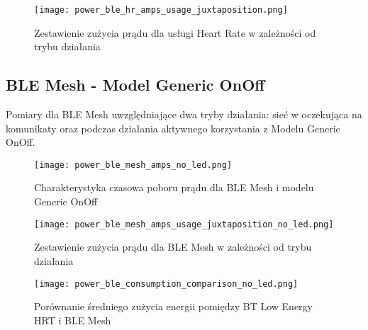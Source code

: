 \lipsum[1-2]
\begin{figure}[!htb]
	\centering \texttt{[image: power\_ble\_hr\_amps\_usage\_juxtaposition.png]}
	\caption{Zestawienie zużycia prądu dla usługi Heart Rate w zależności od trybu działania}
	\label{rys:power_ble_hr_amps_usage_juxtaposition}
\end{figure}
\lipsum[1-3]

\subsection{BLE Mesh - Model Generic OnOff}

Pomiary dla BLE Mesh uwzględniające dwa tryby działania: sieć w oczekująca na komunikaty oraz podczas działania aktywnego korzystania z Modelu Generic OnOff.

\begin{figure}[!htb]
	\centering \texttt{[image: power\_ble\_mesh\_amps\_no\_led.png]} 
	\caption{Charakterystyka czasowa poboru prądu dla BLE Mesh i modelu Generic OnOff}
	\label{rys:power_ble_mesh_amps}
\end{figure}

\lipsum[1-3]
\begin{figure}[!htb]
	\centering \texttt{[image: power\_ble\_mesh\_amps\_usage\_juxtaposition\_no\_led.png]} 
	\caption{Zestawienie zużycia prądu dla BLE Mesh w zależności od trybu działania}
	\label{rys:power_ble_mesh_amps_usage_juxtaposition}
\end{figure}

\lipsum[1-3]
\begin{figure}[!htb]
	\centering \texttt{[image: power\_ble\_consumption\_comparison\_no\_led.png]} 
	\caption{Porównanie średniego zużycia energii pomiędzy BT Low Energy HRT i BLE Mesh}
	\label{rys:power_ble_consumption_comparison}
\end{figure}


